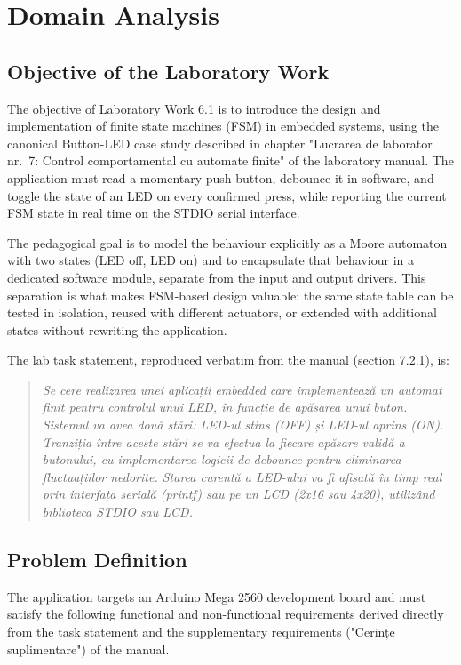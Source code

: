 \section{Domain Analysis}

\subsection{Objective of the Laboratory Work}

The objective of Laboratory Work 6.1 is to introduce the design and implementation of finite state machines (FSM) in embedded systems, using the canonical Button-LED case study described in chapter "Lucrarea de laborator nr.~7: Control comportamental cu automate finite" of the laboratory manual. The application must read a momentary push button, debounce it in software, and toggle the state of an LED on every confirmed press, while reporting the current FSM state in real time on the STDIO serial interface.

The pedagogical goal is to model the behaviour explicitly as a Moore automaton with two states (LED off, LED on) and to encapsulate that behaviour in a dedicated software module, separate from the input and output drivers. This separation is what makes FSM-based design valuable: the same state table can be tested in isolation, reused with different actuators, or extended with additional states without rewriting the application.

The lab task statement, reproduced verbatim from the manual (section 7.2.1), is:

\begin{quote}
\itshape
Se cere realizarea unei aplicații embedded care implementează un automat finit pentru controlul unui LED, în funcție de apăsarea unui buton. Sistemul va avea două stări: LED-ul stins (OFF) și LED-ul aprins (ON). Tranziția între aceste stări se va efectua la fiecare apăsare validă a butonului, cu implementarea logicii de debounce pentru eliminarea fluctuațiilor nedorite. Starea curentă a LED-ului va fi afișată în timp real prin interfața serială (printf) sau pe un LCD (2x16 sau 4x20), utilizând biblioteca STDIO sau LCD.
\end{quote}

\subsection{Problem Definition}

The application targets an Arduino Mega 2560 development board and must satisfy the following functional and non-functional requirements derived directly from the task statement and the supplementary requirements ("Cerințe suplimentare") of the manual.

